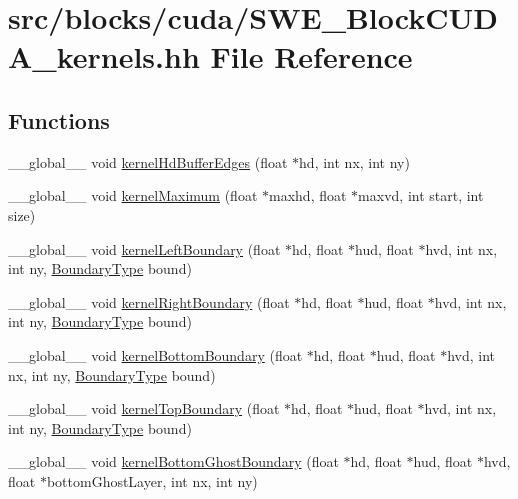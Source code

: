 \hypertarget{SWE__BlockCUDA__kernels_8hh}{\section{src/blocks/cuda/\-S\-W\-E\-\_\-\-Block\-C\-U\-D\-A\-\_\-kernels.hh File Reference}
\label{SWE__BlockCUDA__kernels_8hh}
}
\subsection*{Functions}
\begin{DoxyCompactItemize}
\item 
\-\_\-\-\_\-global\-\_\-\-\_\- void \hyperlink{SWE__BlockCUDA__kernels_8hh_ad34d42b9197cf6063931cb1bf7c03bd4}{kernel\-Hd\-Buffer\-Edges} (float $\ast$hd, int nx, int ny)
\item 
\-\_\-\-\_\-global\-\_\-\-\_\- void \hyperlink{SWE__BlockCUDA__kernels_8hh_ae810017f0a27a38e1c5d78c7130e8ab4}{kernel\-Maximum} (float $\ast$maxhd, float $\ast$maxvd, int start, int size)
\item 
\-\_\-\-\_\-global\-\_\-\-\_\- void \hyperlink{SWE__BlockCUDA__kernels_8hh_a70e795bea06be7152de387957e090eb3}{kernel\-Left\-Boundary} (float $\ast$hd, float $\ast$hud, float $\ast$hvd, int nx, int ny, \hyperlink{SWE__Scenario_8hh_af75d5dd7322fa39ed0af4e7839e600f8}{Boundary\-Type} bound)
\item 
\-\_\-\-\_\-global\-\_\-\-\_\- void \hyperlink{SWE__BlockCUDA__kernels_8hh_a5b25e2843f0f18a4a5843165ce46054f}{kernel\-Right\-Boundary} (float $\ast$hd, float $\ast$hud, float $\ast$hvd, int nx, int ny, \hyperlink{SWE__Scenario_8hh_af75d5dd7322fa39ed0af4e7839e600f8}{Boundary\-Type} bound)
\item 
\-\_\-\-\_\-global\-\_\-\-\_\- void \hyperlink{SWE__BlockCUDA__kernels_8hh_a776336452fee130d27d02b109a7ab89d}{kernel\-Bottom\-Boundary} (float $\ast$hd, float $\ast$hud, float $\ast$hvd, int nx, int ny, \hyperlink{SWE__Scenario_8hh_af75d5dd7322fa39ed0af4e7839e600f8}{Boundary\-Type} bound)
\item 
\-\_\-\-\_\-global\-\_\-\-\_\- void \hyperlink{SWE__BlockCUDA__kernels_8hh_a655f11967ba2a7ed124b92a9f1400788}{kernel\-Top\-Boundary} (float $\ast$hd, float $\ast$hud, float $\ast$hvd, int nx, int ny, \hyperlink{SWE__Scenario_8hh_af75d5dd7322fa39ed0af4e7839e600f8}{Boundary\-Type} bound)
\item 
\-\_\-\-\_\-global\-\_\-\-\_\- void \hyperlink{SWE__BlockCUDA__kernels_8hh_a899b7431f0cec06555bf3b0d8e848782}{kernel\-Bottom\-Ghost\-Boundary} (float $\ast$hd, float $\ast$hud, float $\ast$hvd, float $\ast$bottom\-Ghost\-Layer, int nx, int ny)

\end{DoxyCompactItemize}
